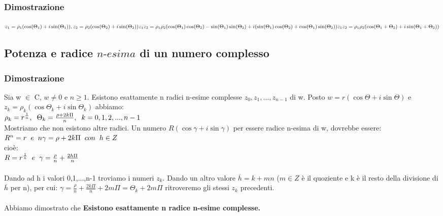\documentclass[11pt, a4paper]{article}
\begin{document}
\subsubsection*{Dimostrazione}
\begin{math}
z_1=\rho_1(\cos(\Theta_1)+i\sin(\Theta_1)),z_2=\rho_2(\cos(\Theta_2)+i\sin(\Theta_2))\\
z_1z_2=\rho_1\rho_2(\cos(\Theta_1)\cos(\Theta_2)-\sin(\Theta_1)\sin(\Theta_2)+i(\sin(\Theta_1)\cos(\Theta_2)+\cos(\Theta_1)\sin(\Theta_2))\\
z_1z_2=\rho_1\rho_2(\cos(\Theta_1+\Theta_2)+i\sin(\Theta_1+\Theta_2))
\end{math}
\subsection{Potenza e radice $\textit{n-esima}$ di un numero complesso}
\subsubsection*{Dimostrazione}
Sia w $\in$ C, $w\neq0$ e $n\geq 1$. Esistono esattamente n radici n-esime complesse $z_0,z_1, ... , z_{n-1}$ di w. Posto $ w=r(\cos\Theta + i\sin\Theta)$ e $z_k = \rho_k(\cos\Theta_k + i\sin\Theta_k)$ abbiamo:\\
$\rho_k=r^{\frac{1}{n}}, \hspace{0.2cm} \Theta_k=\frac{\rho+2k\Pi}{n}, \hspace{0.2cm} k=0,1,2,...,n-1	$\\
Mostriamo che non esistono altre radici. Un numero $R(\cos\gamma + i\sin\gamma)$ per essere radice n-esima di w, dovrebbe essere:\\
$R^n=r \hspace{0.2cm} e \hspace{0.2cm} n\gamma=\rho+2k\Pi \hspace{0.2cm} con \hspace{0.2cm} h\in Z$\\ cioè:\\ 
$R=r^{\frac{1}{n}} \hspace{0.2cm} e \hspace{0.2cm} \gamma=\frac{\rho}{n}+\frac{2h\Pi}{n}$
\\
\\
Dando ad h i valori 0,1,...,n-1 troviamo i numeri $z_k$. Dando un altro valore $\overline{h}=k+mn$ ($m\in Z$ è il quoziente e k è il resto della divisione di $\overline{h}$ per n), per cui: $\gamma=\frac{\rho}{n}+\frac{2k\Pi}{n}+2m\Pi=\Theta_k+2m\Pi$ ritroveremo gli stessi $z_k$ precedenti.\\\\
Abbiamo dimostrato che \textbf{Esistono esattamente n radice n-esime complesse.}
\end{document}
